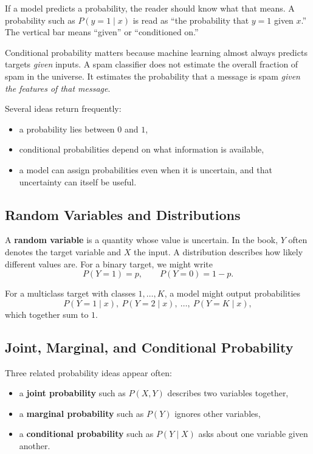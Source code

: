 If a model predicts a probability, the reader should know what that means. A probability such as $P(y=1 \mid x)$ is read as ``the probability that $y=1$ given $x$.'' The vertical bar means ``given'' or ``conditioned on.''

Conditional probability matters because machine learning almost always predicts targets \emph{given} inputs. A spam classifier does not estimate the overall fraction of spam in the universe. It estimates the probability that a message is spam \emph{given the features of that message}.

Several ideas return frequently:
\begin{itemize}[leftmargin=*]
\item a probability lies between $0$ and $1$,
\item conditional probabilities depend on what information is available,
\item a model can assign probabilities even when it is uncertain, and that uncertainty can itself be useful.
\end{itemize}

\subsection{Random Variables and Distributions}

A \textbf{random variable} is a quantity whose value is uncertain. In the book, $Y$ often denotes the target variable and $X$ the input. A distribution describes how likely different values are. For a binary target, we might write
\[
P(Y=1) = p,
\qquad
P(Y=0) = 1-p.
\]

For a multiclass target with classes $1,\ldots,K$, a model might output probabilities
\[
P(Y=1 \mid x),\ P(Y=2 \mid x),\ \ldots,\ P(Y=K \mid x),
\]
which together sum to $1$.

\subsection{Joint, Marginal, and Conditional Probability}

Three related probability ideas appear often:
\begin{itemize}[leftmargin=*]
\item a \textbf{joint probability} such as $P(X,Y)$ describes two variables together,
\item a \textbf{marginal probability} such as $P(Y)$ ignores other variables,
\item a \textbf{conditional probability} such as $P(Y \mid X)$ asks about one variable given another.
\end{itemize}

